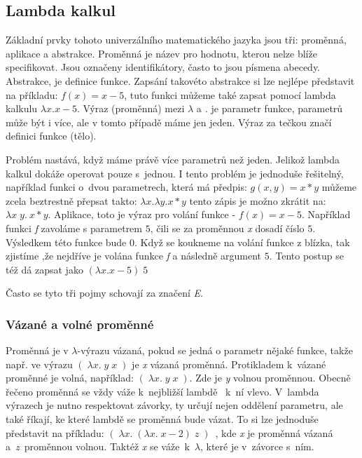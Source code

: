 \documentclass[12pt,a4paper]{report}
\begin{document}
\subsection{Lambda kalkul}
Základní prvky tohoto univerzálního matematického jazyka jsou tři: proměnná, aplikace a abstrakce. Proměnná je název pro hodnotu, kterou nelze blíže specifikovat. Jsou označeny identifikátory, často to jsou písmena abecedy. %
Abstrakce, je definice funkce. Zapsání takovéto abstrakce si lze nejlépe představit na příkladu: $f(x) = x - 5$, tuto funkci můžeme také zapsat pomocí lambda kalkulu $\lambda x.x - 5 $. \cite{volné a vázané} Výraz (proměnná) mezi $\lambda$ a \textit{.} je parametr funkce, parametrů může být i více, ale v tomto případě máme jen jeden. Výraz za tečkou značí definici funkce (tělo). 

Problém nastává, když máme právě více parametrů než jeden. Jelikož lambda kalkul dokáže operovat pouze s~jednou. I tento problém je jednoduše řešitelný, například funkci o~dvou parametrech, která má předpis: $g(x,y) = x * y$  můžeme zcela beztrestně přepsat takto: $\lambda x. \lambda y. x * y $ tento zápis je možno zkrátit na: $\lambda x \; y.\ x * y $. Aplikace, toto je výraz pro volání funkce - $f(x) = x - 5$. Například funkci \textit{f} zavoláme s parametrem $5$, čili se za proměnnou \textit{x} dosadí číslo $5$. Výsledkem této funkce bude $0$. Když se koukneme na volání funkce z blízka, tak zjistíme ,že nejdříve je volána funkce \textit{f} a následně argument $5$. Tento postup se též dá zapsat jako $(\lambda x.x - 5) \;5$  

Často se tyto tři pojmy schovají za značení \textit{E}. 
\subsubsection{Vázané a volné proměnné}
Proměnná je v $\lambda$-výrazu vázaná, pokud se jedná o parametr nějaké funkce, takže např. ve výrazu $ (\; \lambda x . \; y\; x\; )$ je \textit{x} vázaná proměnná. \cite{volné a vázané} Protikladem k~vázané proměnné je volná, například: $(\; \lambda x . \; y\; x\; )$. Zde je \textit{y} volnou proměnnou. Obecně řečeno proměnná se vždy váže k~nejbližší lambdě ~k~ní vlevo. V~lambda výrazech je nutno respektovat závorky, ty určují nejen oddělení parametru, ale také říkají, ke které lambdě se proměnná bude vázat. To si lze jednoduše představit na příkladu: $ ( \; \lambda x . \; (\lambda x .\; x - 2)\; z\; ) $~, kde \textit{x} je proměnná vázaná a~\textit{z}~proměnnou volnou. Taktéž \textit{x} se váže~k~$\lambda$, které je v~závorce s~ním. 
\end{document}

